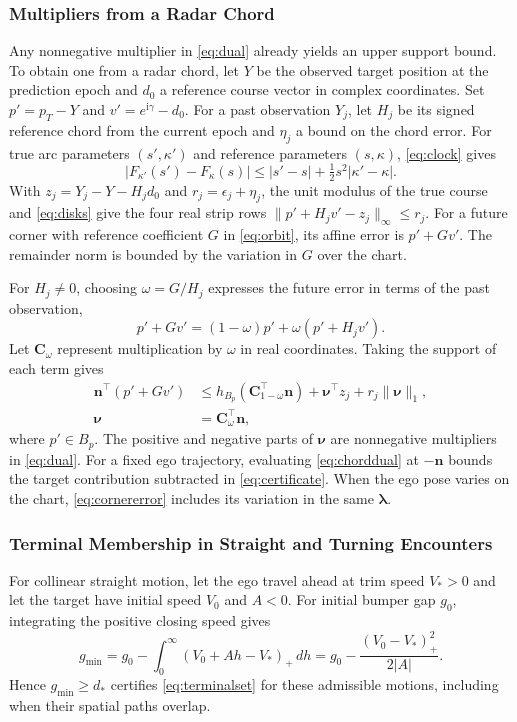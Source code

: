 \documentclass[journal]{IEEEtran}
\theoremstyle{definition}
\newcommand{\vct}[1]{\boldsymbol{#1}}
\newcommand{\mtx}[1]{\mathbf{#1}}
\begin{document}
\subsubsection{Multipliers from a Radar Chord}
Any nonnegative multiplier in \eqref{eq:dual} already yields an upper
support bound. To obtain one from a radar chord, let $Y$ be the
observed target position at the prediction epoch and
$d_0$ a reference course vector in complex coordinates. Set $p'=p_T-Y$
and $v'=e^{\mathrm i\gamma}-d_0$. For a past observation $Y_j$, let
$H_j$ be its signed reference chord from the current epoch and $\eta_j$
a bound on the chord error. For true arc parameters $(s',\kappa')$ and
reference parameters $(s,\kappa)$, \eqref{eq:clock} gives
\begin{equation*}
 |F_{\kappa'}(s')-F_\kappa(s)|
 \le |s'-s|+\tfrac12 s^2|\kappa'-\kappa|.
\end{equation*}
With $z_j=Y_j-Y-H_jd_0$ and $r_j=\epsilon_j+\eta_j$, the unit modulus
of the true course and \eqref{eq:disks} give the four real strip rows
$\|p'+H_jv'-z_j\|_\infty\le r_j$. For a future corner with reference
coefficient $G$ in \eqref{eq:orbit}, its affine error is $p'+Gv'$.
The remainder norm is bounded by the variation in $G$ over the chart.

For $H_j\ne0$, choosing $\omega=G/H_j$ expresses the future error in
terms of the past observation,
\begin{equation*}
 p'+Gv'=(1-\omega)p'+\omega(p'+H_jv').
\end{equation*}
Let $\mtx C_\omega$ represent multiplication by $\omega$ in real
coordinates. Taking the support of each term gives
\begin{equation}\label{eq:chorddual}
\begin{aligned}
 \vct n^\top(p'+Gv')&\le h_{B_p}(\mtx C_{1-\omega}^\top\vct n)
                    +\vct\nu^\top z_j+r_j\|\vct\nu\|_1,\\
 \vct\nu&=\mtx C_\omega^\top\vct n ,
\end{aligned}
\end{equation}
where $p'\in B_p$. The positive and negative parts of $\vct\nu$ are
nonnegative multipliers in \eqref{eq:dual}. For a fixed ego trajectory,
evaluating \eqref{eq:chorddual} at $-\vct n$ bounds the target
contribution subtracted in \eqref{eq:certificate}. When the ego pose
varies on the chart, \eqref{eq:cornererror} includes its variation
in the same $\vct\lambda$.

\subsubsection{Terminal Membership in Straight and Turning Encounters}
For collinear straight motion, let the ego travel ahead at trim speed
$V_*>0$ and let the target have initial speed $V_0$ and $A<0$. For
initial bumper gap $g_0$, integrating the positive closing speed gives
\begin{equation*}
 g_{\min}=g_0-\int_0^\infty(V_0+Ah-V_*)_+\,dh
         =g_0-\frac{(V_0-V_*)_+^2}{2|A|}.
\end{equation*}
Hence $g_{\min}\ge d_*$ certifies \eqref{eq:terminalset} for these
admissible motions, including when their spatial paths overlap.
\end{document}
